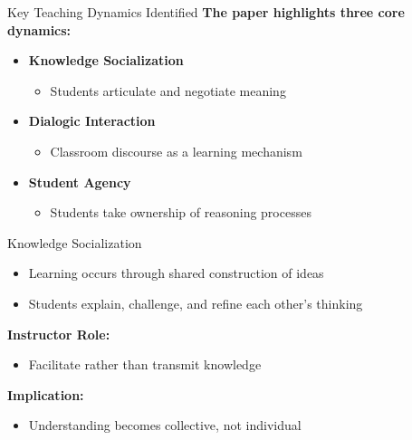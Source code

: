 \documentclass[dvipsnames]{beamer}
\begin{document}
\begin{frame}{Key Teaching Dynamics Identified}
\textbf{The paper highlights three core dynamics:}

\begin{itemize}
    \item \textbf{Knowledge Socialization}
    \begin{itemize}
        \item Students articulate and negotiate meaning
    \end{itemize}
    
    \item \textbf{Dialogic Interaction}
    \begin{itemize}
        \item Classroom discourse as a learning mechanism
    \end{itemize}
    
    \item \textbf{Student Agency}
    \begin{itemize}
        \item Students take ownership of reasoning processes
    \end{itemize}
\end{itemize}
\end{frame}


\begin{frame}{Knowledge Socialization}
\begin{itemize}
    \item Learning occurs through shared construction of ideas
    \item Students explain, challenge, and refine each other's thinking
\end{itemize}

\vspace{0.5cm}

\textbf{Instructor Role:}
\begin{itemize}
    \item Facilitate rather than transmit knowledge
\end{itemize}

\vspace{0.5cm}

\textbf{Implication:}
\begin{itemize}
    \item Understanding becomes collective, not individual
\end{itemize}
\end{frame}
\end{document}
